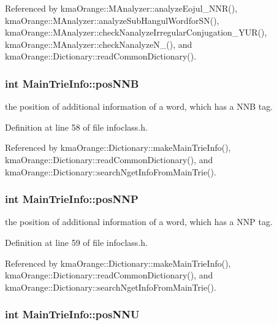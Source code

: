 Referenced by kmaOrange::MAnalyzer::analyzeEojul\_\-NNR(), kmaOrange::MAnalyzer::analyzeSubHangulWordforSN(), kmaOrange::MAnalyzer::checkNanalyzeIrregularConjugation\_\-YUR(), kmaOrange::MAnalyzer::checkNanalyzeN\_\-(), and kmaOrange::Dictionary::readCommonDictionary().\hypertarget{classMainTrieInfo_0d7bda79214949fad26706e5e3dbad84}{
\subsubsection[{posNNB}]{\setlength{\rightskip}{0pt plus 5cm}int {\bf MainTrieInfo::posNNB}}}
\label{classMainTrieInfo_0d7bda79214949fad26706e5e3dbad84}


the position of additional information of a word, which has a NNB tag. 



Definition at line 58 of file infoclass.h.

Referenced by kmaOrange::Dictionary::makeMainTrieInfo(), kmaOrange::Dictionary::readCommonDictionary(), and kmaOrange::Dictionary::searchNgetInfoFromMainTrie().\hypertarget{classMainTrieInfo_38e0c8dbd7a077775365baa8e82655bb}{
\subsubsection[{posNNP}]{\setlength{\rightskip}{0pt plus 5cm}int {\bf MainTrieInfo::posNNP}}}
\label{classMainTrieInfo_38e0c8dbd7a077775365baa8e82655bb}


the position of additional information of a word, which has a NNP tag. 



Definition at line 59 of file infoclass.h.

Referenced by kmaOrange::Dictionary::makeMainTrieInfo(), kmaOrange::Dictionary::readCommonDictionary(), and kmaOrange::Dictionary::searchNgetInfoFromMainTrie().\hypertarget{classMainTrieInfo_ef418954521cb760e6f6550390a44a67}{
\subsubsection[{posNNU}]{\setlength{\rightskip}{0pt plus 5cm}int {\bf MainTrieInfo::posNNU}}}
\label{classMainTrieInfo_ef418954521cb760e6f6550390a44a67}


